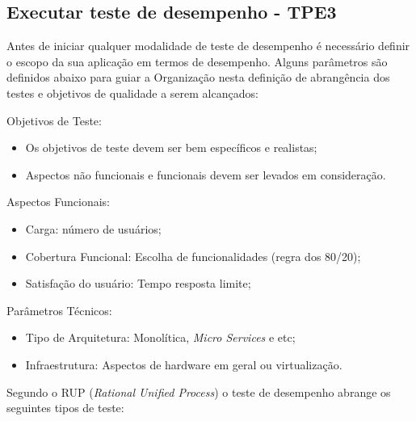 \subsection{Executar teste de desempenho - TPE3}
\label{sec:guiatpe3}

Antes de iniciar qualquer modalidade de teste de desempenho é necessário definir o escopo da sua aplicação em termos de desempenho. Alguns parâmetros são definidos abaixo para guiar a Organização nesta definição de abrangência dos testes e objetivos de qualidade a serem alcançados: 

Objetivos de Teste:

\begin{itemize}
	\item Os objetivos de teste devem ser bem específicos e realistas;
	\item Aspectos não funcionais e funcionais devem ser levados em consideração.
\end{itemize}

Aspectos Funcionais:

\begin{itemize}
	\item Carga: número de usuários;
	\item Cobertura Funcional: Escolha de funcionalidades (regra dos 80/20);
	\item Satisfação do usuário: Tempo resposta limite;
\end{itemize}

Parâmetros Técnicos:

\begin{itemize}
	\item Tipo de Arquitetura: Monolítica, \textit{Micro Services} e etc;
	\item Infraestrutura: Aspectos de hardware em geral ou virtualização.
\end{itemize}


Segundo o RUP (\textit{Rational Unified Process}) \cite{RUP940320} o teste de desempenho abrange os seguintes tipos de teste:

